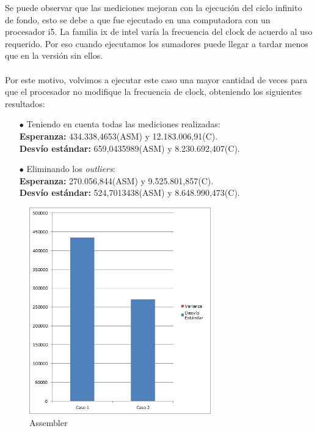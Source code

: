Se puede observar que las mediciones mejoran con la ejecuci\'on del ciclo infinito de fondo, esto se debe a que fue ejecutado en una computadora con un procesador i5. La familia ix de intel varía la frecuencia del clock de acuerdo al uso requerido. Por eso cuando ejecutamos los sumadores puede llegar a tardar menos que en la versi\'on sin ellos.\\
\\

Por este motivo, volvimos a ejecutar este caso una mayor cantidad de veces para que el procesador no modifique la frecuencia de clock, obteniendo los siguientes resultados: \\
\begin{itemize}
\item[$\bullet$] Teniendo en cuenta todas las mediciones realizadas: \\
\textbf{Esperanza:} 434.338,4653(ASM) y 12.183.006,91(C). \\
\textbf{Desv\'io est\'andar:} 659,0435989(ASM) y 8.230.692,407(C).
\item[$\bullet$] Eliminando los \textit{outliers}: \\
\textbf{Esperanza:} 270.056,844(ASM) y 9.525.801,857(C). \\
\textbf{Desv\'io est\'andar:} 524,7013438(ASM) y 8.648.990,473(C).
\end{itemize}

\begin{figure}[h!]
  \begin{center}
	\includegraphics[width=0.7\textwidth]{imagenes/perdidaASM}
	\caption{Assembler}
  \end{center}
\end{figure}

